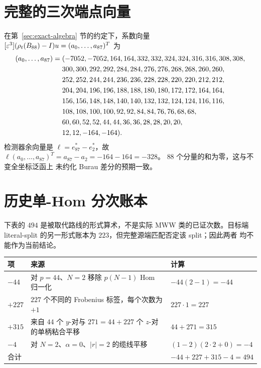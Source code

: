 \section{完整的三次端点向量}\label{app:vector}

在第~\ref{sec:exact-algebra} 节的约定下，系数向量
$[\varepsilon^3](\rho_t(B_{88})-I)u=(a_0,\ldots,a_{87})^T$ 为
\begin{align}
(a_0,\ldots,a_{87})={}&(
-7052,-7052,164,164,332,332,324,324,316,316,308,308,\notag\\
&300,300,292,292,284,284,276,276,268,268,260,260,\notag\\
&252,252,244,244,236,236,228,228,220,220,212,212,\notag\\
&204,204,196,196,188,188,180,180,172,172,164,164,\notag\\
&156,156,148,148,140,140,132,132,124,124,116,116,\notag\\
&108,108,100,100,92,92,84,84,76,76,68,68,\notag\\
&60,60,52,52,44,44,36,36,28,28,20,20,\notag\\
&12,12,-164,-164).
\end{align}
检测器余向量是 $\ell=e_{87}^*-e_2^*$，故
$\ell(a_0,\ldots,a_{87})^T=a_{87}-a_2=-164-164=-328$。
$88$ 个分量的和为零，这与不变全坐标泛函上
未约化 Burau 差分的预期一致。

\section{历史单-Hom 分次账本}\label{app:grading}

下表的 $494$ 是被取代路线的形式算术，不是实际 MWW 类的已证次数。目标端
literal-split 的另一形式账本为 $223$，但完整源端匹配否定该 split；因此两者
均不能作为当前结论。

\begin{center}
\begin{tabular}{@{}p{}p{}p{}@{}}
\toprule
项 & 来源 & 计算 \\
\midrule
$-44$ & 对 $p=44$、$N=2$ 移除 $p(N-1)$ Hom 归一化 & $-44(2-1)=-44$\\
$+227$ & $227$ 个不同的 Frobenius 标签，每个次数为 $+1$ & $227\cdot1=227$\\
$+315$ & 来自 $44$ 个 $y$-对与 $271=44+227$ 个 $z$-对的单柄粘合平移 & $44+271=315$\\
$-4$ & 对 $N=2$、$\alpha=0$、$|r|=2$ 的缆线平移 & $(1-2)(2\cdot2+0)=-4$\\
\midrule
合计 & & $-44+227+315-4=494$\\
\bottomrule
\end{tabular}
\end{center}

